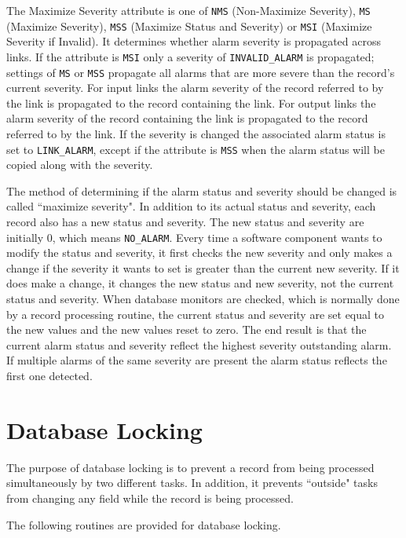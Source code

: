 The Maximize Severity attribute is one of \verb|NMS| (Non-Maximize Severity), \verb|MS| (Maximize Severity),
\verb|MSS| (Maximize Status and Severity) or \verb|MSI| (Maximize Severity if Invalid).
It determines whether alarm severity is propagated across links.
If the attribute is \verb|MSI| only a severity of \verb|INVALID_ALARM| is propagated; settings of \verb|MS| or \verb|MSS|
propagate all alarms that are more severe than the record's current severity.
For input links the alarm severity of the record referred to by the link is propagated to the record containing the link.
For output links the alarm severity of the record containing the link is propagated to the record referred to by the link.
If the severity is changed the associated alarm status is set to \verb|LINK_ALARM|, except if the attribute is \verb|MSS|
when the alarm status will be copied along with the severity.

The method of determining if the alarm status and severity should be changed is called ``maximize severity".
In addition to its actual status and severity, each record also has a new status and severity.
The new status and severity are initially 0, which means \verb|NO_ALARM|.
Every time a software component wants to modify the status and severity, it first checks the new severity and only makes a
change if the severity it wants to set is greater than the current new severity.
If it does make a change, it changes the new status and new severity, not the current status and severity.
When database monitors are checked, which is normally done by a record processing routine, the current status and severity
are set equal to the new values and the new values reset to zero.
The end result is that the current alarm status and severity reflect the highest severity outstanding alarm.
If multiple alarms of the same severity are present the alarm status reflects the first one detected.

\section{Database Locking}

The purpose of database locking is to prevent a record from being processed simultaneously by two different tasks.
In addition, it prevents ``outside" tasks from changing any field while the record is being processed.

The following routines are provided for database locking.

